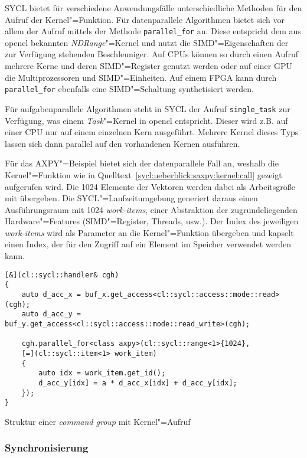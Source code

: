 SYCL bietet für verschiedene Anwendungsfälle unterschiedliche Methoden für den
Aufruf der Kernel"=Funktion. Für datenparallele Algorithmen bietet sich vor
allem der Aufruf mittels der Methode \texttt{parallel\_for} an. Diese
entspricht dem aus \gls{opencl} bekannten \textit{NDRange}"=Kernel und nutzt die
SIMD"=Eigenschaften der zur Verfügung stehenden Beschleuniger. Auf CPUs können
so durch einen Aufruf mehrere Kerne und deren SIMD"=Register genutzt werden oder
auf einer GPU die Multiprozessoren und SIMD"=Einheiten. Auf einem FPGA kann
durch \texttt{parallel\_for} ebenfalls eine SIMD"=Schaltung synthetisiert
werden. 

Für aufgabenparallele Algorithmen steht in SYCL der Aufruf \texttt{single\_task}
zur Verfügung, was einem \textit{Task}"=Kernel in \gls{opencl} entspricht.
Dieser wird z.B. auf einer CPU nur auf einem einzelnen Kern ausgeführt. Mehrere
Kernel dieses Typs lassen sich dann parallel auf den vorhandenen Kernen
ausführen.

Für das AXPY"=Beispiel bietet sich der datenparallele Fall an, weshalb die
Kernel"=Funktion wie in Quelltext~\ref{sycl:ueberblick:saxpy:kernel:call}
gezeigt aufgerufen wird. Die \num{1024} Elemente der Vektoren werden dabei als
Arbeitsgröße mit übergeben. Die SYCL"=Laufzeitumgebung generiert daraus einen
Ausführungsraum mit \num{1024} \textit{work-items}, einer Abstraktion der
zugrundeliegenden Hardware"=Features (SIMD"=Register, Threads, usw.). Der Index
des jeweiligen \textit{work-items} wird als Parameter an die Kernel"=Funktion
übergeben und kapselt einen Index, der für den Zugriff auf ein Element im
Speicher verwendet werden kann. 

\begin{code}
    \begin{verbatim}
[&](cl::sycl::handler& cgh)
{
    auto d_acc_x = buf_x.get_access<cl::sycl::access::mode::read>(cgh);
    auto d_acc_y = buf_y.get_access<cl::sycl::access::mode::read_write>(cgh);

    cgh.parallel_for<class axpy>(cl::sycl::range<1>{1024},
    [=](cl::sycl::item<1> work_item)
    {
        auto idx = work_item.get_id();
        d_acc_y[idx] = a * d_acc_x[idx] + d_acc_y[idx];
    });
}
    \end{verbatim}
    \caption{Struktur einer \textit{command group} mit Kernel"=Aufruf}
    \label{sycl:ueberblick:saxpy:kernel:call}
\end{code}

\subsubsection{Synchronisierung}
\label{sycl:ueberblick:saxpy:sync}

